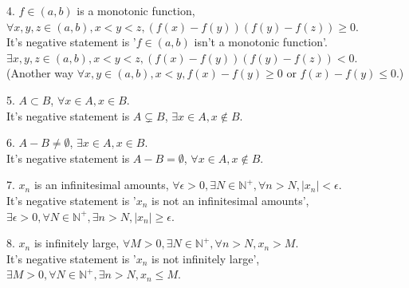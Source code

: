  	4. $ f\in (a,b) $ is a monotonic function, $ \forall x,y,z \in (a,b), x<y<z, (f(x)-f(y))(f(y)-f(z))\ge 0 $.\\
 	It's negative statement is '$ f\in (a,b) $ isn't a monotonic function'. $ \exists x,y,z \in (a,b), x<y<z, (f(x)-f(y))(f(y)-f(z))< 0 $.\\
 	(Another way $ \forall x,y \in (a,b), x<y, f(x)-f(y)\ge 0 \text{ or } f(x)-f(y)\leqslant 0 $.)
 	
 	5. $ A \subset B $, $ \forall x\in A, x\in B $.\\
 	It's negative statement is $ A \subsetneq B $, $ \exists x\in A, x\notin B $.
 	
 	6. $ A-B\neq \emptyset $, $ \exists x\in A, x\in B $.\\
 	It's negative statement is $ A-B = \emptyset $, $ \forall x\in A, x\notin B $.
 	
 	7. {$ x_n $} is an infinitesimal amounts, $ \forall \epsilon >0, \exists N\in \mathbb{N}^+, \forall n>N, |x_n|<\epsilon $.\\
 	It's negative statement is '{$ x_n $} is not an infinitesimal amounts', $ \exists \epsilon >0, \forall N\in \mathbb{N}^+, \exists n>N, |x_n|\ge\epsilon $.
 	
 	8. {$ x_n $} is infinitely large, $ \forall M >0, \exists N\in \mathbb{N}^+, \forall n>N, x_n>M $.\\
 	It's negative statement is '{$ x_n $} is not infinitely large', $ \exists M >0, \forall N\in \mathbb{N}^+, \exists n>N, x_n\leqslant M $.
 	